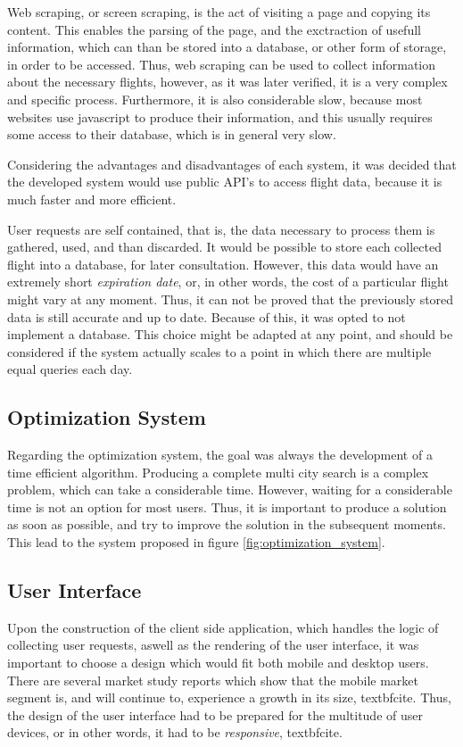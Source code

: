 Web scraping, or screen scraping, is the act of visiting a page and copying its content.
This enables the parsing of the page, and the exctraction of usefull information,
which can than be stored into a database, or other form of storage, in order to be accessed.
Thus, web scraping can be used to collect information about the necessary flights,
however, as it was later verified, it is a very complex and specific process.
Furthermore, it is also considerable slow, because most websites use javascript
to produce their information, and this usually requires some access to their database,
which is in general very slow.

Considering the advantages and disadvantages of each system,
it was decided that the developed system would use public API's to access flight data,
because it is much faster and more efficient.

User requests are self contained, that is, the data necessary to process them is gathered,
used, and than discarded. It would be possible to store each collected flight into a database, for later consultation.
However, this data would have an extremely short \textit{expiration date}, or,
in other words, the cost of a particular flight might vary at any moment.
Thus, it can not be proved that the previously stored data is still accurate and up to date.
Because of this, it was opted to not implement a database.
This choice might be adapted at any point, and should be considered if the system actually scales 
to a point in which there are multiple equal queries each day.



\subsection{Optimization System}
Regarding the optimization system, the goal was always the development of a time efficient algorithm.
Producing a complete multi city search is a complex problem, which can take a considerable time.
However, waiting for a considerable time is not an option for most users.
Thus, it is important to produce a solution as soon as possible, and try to improve the solution 
in the subsequent moments. This lead to the system proposed in figure \ref{fig:optimization_system}.



\subsection{User Interface}
Upon the construction of the client side application, which handles the logic of collecting 
user requests, aswell as the rendering of the user interface,
it was important to choose a design which would fit both mobile and desktop users.
There are several market study reports which show that the mobile market segment 
is, and will continue to, experience a growth in its size, textbf{cite}.
Thus, the design of the user interface had to be prepared for the multitude of user devices,
or in other words, it had to be \textit{responsive}, textbf{cite}.





